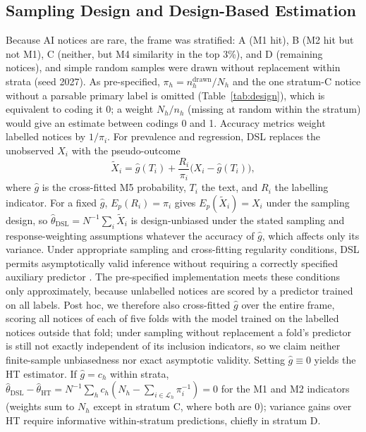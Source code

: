 \documentclass[runningheads]{llncs}
\begin{document}
\subsection{Sampling Design and Design-Based Estimation}
\label{sec:design}
Because AI notices are rare, the frame was stratified: A (M1 hit), B (M2 hit but not M1), C (neither, but M4 similarity in the top 3\%), and D (remaining notices), and simple random samples were drawn without replacement within strata (seed 2027). As pre-specified, $\pi_h=n^{\mathrm{drawn}}_h/N_h$ and the one stratum-C notice without a parsable primary label is omitted (Table~\ref{tab:design}), which is equivalent to coding it 0; a weight $N_h/n_h$ (missing at random within the stratum) would give an estimate between codings 0 and 1. Accuracy metrics weight labelled notices by $1/\pi_i$. For prevalence and regression, DSL replaces the unobserved $X_i$ with the pseudo-outcome
\begin{equation}
\tilde{X}_i=\hat{g}(T_i)+\frac{R_i}{\pi_i}\bigl(X_i-\hat{g}(T_i)\bigr),
\label{eq:pseudo}
\end{equation}
where $\hat{g}$ is the cross-fitted M5 probability, $T_i$ the text, and $R_i$ the labelling indicator. For a fixed $\hat{g}$, $E_p(R_i)=\pi_i$ gives $E_p(\tilde{X}_i)=X_i$ under the sampling design, so $\hat\theta_{\mathrm{DSL}}=N^{-1}\sum_i\tilde{X}_i$ is design-unbiased under the stated sampling and response-weighting assumptions whatever the accuracy of $\hat{g}$, which affects only its variance. Under appropriate sampling and cross-fitting regularity conditions, DSL permits asymptotically valid inference without requiring a correctly specified auxiliary predictor \cite{egami2023}. The pre-specified implementation meets these conditions only approximately, because unlabelled notices are scored by a predictor trained on all labels. Post hoc, we therefore also cross-fitted $\hat{g}$ over the entire frame, scoring all notices of each of five folds with the model trained on the labelled notices outside that fold; under sampling without replacement a fold's predictor is still not exactly independent of its inclusion indicators, so we claim neither finite-sample unbiasedness nor exact asymptotic validity. Setting $\hat{g}\equiv0$ yields the HT estimator. If $\hat{g}=c_h$ within strata, $\hat\theta_{\mathrm{DSL}}-\hat\theta_{\mathrm{HT}}=N^{-1}\sum_h c_h(N_h-\sum_{i\in\mathcal{L}_h}\pi_i^{-1})=0$ for the M1 and M2 indicators (weights sum to $N_h$ except in stratum C, where both are 0); variance gains over HT require informative within-stratum predictions, chiefly in stratum D.
\end{document}
